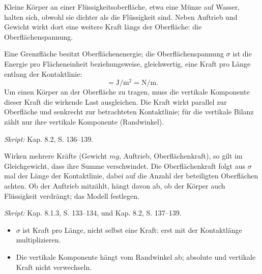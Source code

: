 
Kleine Körper an einer Flüssigkeitsoberfläche, etwa eine Münze auf Wasser,
halten sich, obwohl sie dichter als die Flüssigkeit sind. Neben Auftrieb und
Gewicht wirkt dort eine weitere Kraft längs der Oberfläche:
die Oberflächenspannung.

\begin{werkzeugkasten}
Eine Grenzfläche besitzt Oberflächenenergie; die Oberflächenspannung
$\sigma$ ist die Energie pro Flächeneinheit beziehungsweise, gleichwertig,
eine Kraft pro Länge entlang der Kontaktlinie:
\begin{equation}
  [\sigma]=\si{\joule\per\metre\squared}=\si{\newton\per\metre}.
\end{equation}
Um einen Körper an der Oberfläche zu tragen, muss die vertikale Komponente
dieser Kraft die wirkende Last ausgleichen. Die Kraft wirkt parallel zur
Oberfläche und senkrecht zur betrachteten Kontaktlinie; für die vertikale
Bilanz zählt nur ihre vertikale Komponente (Randwinkel).

\textit{Skript:} Kap. 8.2, S. 136--139.
\end{werkzeugkasten}

\begin{werkzeugkasten}
Wirken mehrere Kräfte (Gewicht $mg$, Auftrieb, Oberflächenkraft), so gilt im
Gleichgewicht, dass ihre Summe verschwindet. Die Oberflächenkraft folgt aus
$\sigma$ mal der Länge der Kontaktlinie, dabei auf die Anzahl der beteiligten
Oberflächen achten. Ob der Auftrieb mitzählt, hängt davon ab, ob der Körper
auch Flüssigkeit verdrängt; das Modell festlegen.

\textit{Skript:} Kap. 8.1.3, S. 133--134, und Kap. 8.2, S. 137--139.
\end{werkzeugkasten}

\begin{achtung}
\begin{itemize}
  \item $\sigma$ ist Kraft pro Länge, nicht selbst eine Kraft: erst mit der
        Kontaktlänge multiplizieren.
  \item Die vertikale Komponente hängt vom Randwinkel ab; absolute und
        vertikale Kraft nicht verwechseln.
\end{itemize}
\end{achtung}

